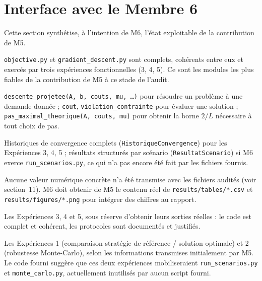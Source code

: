 \documentclass[11pt,a4paper]{article}
\begin{document}
\section{Interface avec le Membre 6}

Cette section synthétise, à l'intention de M6, l'état exploitable de la
contribution de M5.

\begin{description}[style=nextline]
  \item[Modules directement utilisables] \texttt{objective.py} et
  \texttt{gradient\_descent.py} sont complets, cohérents entre eux et
  exercés par trois expériences fonctionnelles (3, 4, 5). Ce sont les
  modules les plus fiables de la contribution de M5 à ce stade de l'audit.
  \item[Fonctions constituant des interfaces importantes]
  \texttt{descente\_projetee(A, b, couts, mu, \ldots)} pour résoudre un
  problème à une demande donnée ; \texttt{cout},
  \texttt{violation\_contrainte} pour évaluer une solution ;
  \texttt{pas\_maximal\_theorique(A, couts, mu)} pour obtenir la borne $2/L$
  nécessaire à tout choix de pas.
  \item[Données récupérables] Historiques de convergence complets
  (\texttt{HistoriqueConvergence}) pour les Expériences 3, 4, 5 ; résultats
  structurés par scénario (\texttt{ResultatScenario}) si M6 exerce
  \texttt{run\_scenarios.py}, ce qui n'a pas encore été fait par les
  fichiers fournis.
  \item[Résultats déjà disponibles] Aucune valeur numérique concrète n'a été
  transmise avec les fichiers audités (voir section~11). M6 doit obtenir de
  M5 le contenu réel de \texttt{results/tables/*.csv} et
  \texttt{results/figures/*.png} pour intégrer des chiffres au rapport.
  \item[Expériences intégrables immédiatement] Les Expériences 3, 4 et 5,
  sous réserve d'obtenir leurs sorties réelles : le code est complet et
  cohérent, les protocoles sont documentés et justifiés.
  \item[Expériences dépendantes du travail de M6] Les Expériences 1
  (comparaison stratégie de référence / solution optimale) et 2 (robustesse
  Monte-Carlo), selon les informations transmises initialement par M5. Le
  code fourni suggère que ces deux expériences mobiliseraient
  \texttt{run\_scenarios.py} et \texttt{monte\_carlo.py}, actuellement
  inutilisés par aucun script fourni.

\end{description}
\end{document}
